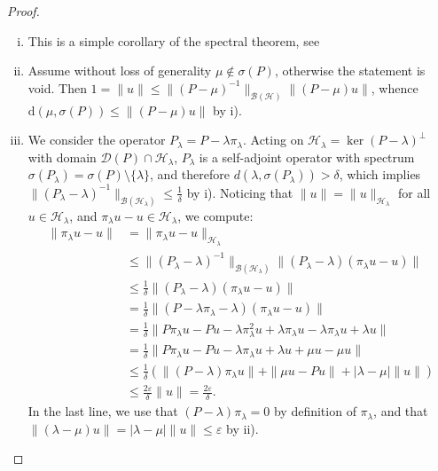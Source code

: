 \documentclass[10pt]{article}
\newcommand{\1}{\mathbbm 1}
\begin{document}
    \begin{proof}
        \begin{enumerate}[i)]
            \item {This is a simple corollary of the spectral theorem, see}
            \item {Assume without loss of generality $\mu\not\in\sigma(P)$, otherwise the statement is void. Then $1 = \|u\| \leq \|(P-\mu)^{-1}\|_{\mathcal B(\mathcal H)} \|(P-\mu)u\|$, whence $\mathrm{d}(\mu,\sigma(P))\leq \| (P-\mu)u\|$ by i).}
            \item {We consider the operator $P_\lambda = P - \lambda\pi_\lambda$. Acting on $\mathcal H_\lambda=\ker (P-\lambda)^{\perp}$ with domain $\mathcal D(P)\cap \mathcal H_\lambda$, $P_\lambda$ is a self-adjoint operator with spectrum $\sigma(P_\lambda) = \sigma(P)\setminus \{\lambda\}$, and therefore $d(\lambda,\sigma(P_\lambda)) > \delta$, which implies $\|(P_\lambda-\lambda)^{-1}\|_{\mathcal B(\mathcal H_\lambda)} \leq \frac1\delta$ by i).
            Noticing that $\|u\| = \|u\|_{\mathcal H_\lambda}$ for all $u\in \mathcal H_\lambda$, and $\pi_\lambda u - u\in \mathcal H_\lambda$, we compute:
            \begin{align*}
               \|\pi_\lambda u -u\| &= \|\pi_\lambda u -u\|_{\mathcal H_\lambda}\\
                &\leq \|(P_\lambda - \lambda)^{-1}\|_{\mathcal B(\mathcal H_\lambda)}\|(P_\lambda - \lambda)(\pi_\lambda u -u)\|\\
                &\leq \frac1\delta\|(P_\lambda - \lambda)(\pi_\lambda u -u) \|\\
                &=\frac1\delta\|(P-\lambda\pi_\lambda-\lambda)(\pi_\lambda u -u)\|\\
                &=\frac1\delta\|P\pi_\lambda u -Pu -\lambda\pi_\lambda^2 u + \lambda\pi_\lambda u -\lambda \pi_\lambda u +\lambda u\|\\
                 &= \frac1\delta \| P\pi_\lambda u - Pu - \lambda\pi_\lambda u + \lambda u + \mu u  - \mu u\|\\
                 &\leq \frac1\delta\left(\|(P-\lambda)\pi_\lambda u\| + \|\mu u - Pu\| + |\lambda - \mu|\|u\|\right)\\
                 &\leq \frac{2\varepsilon}\delta\|u\| = \frac{2\varepsilon}{\delta}.
            \end{align*}
            In the last line, we use that $(P-\lambda)\pi_\lambda = 0$ by definition of $\pi_\lambda$, and that $\|(\lambda -\mu)u\| = |\lambda-\mu|\|u\|\leq \varepsilon$ by ii).
}
\end{enumerate}
\end{proof}
\end{document}
